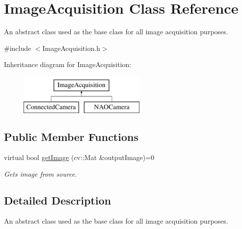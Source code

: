 \hypertarget{classImageAcquisition}{\section{\-Image\-Acquisition \-Class \-Reference}
\label{classImageAcquisition}
}


\-An abstract class used as the base class for all image acquisition purposes.  




{\ttfamily \#include $<$\-Image\-Acquisition.\-h$>$}

\-Inheritance diagram for \-Image\-Acquisition\-:\begin{figure}[H]
\begin{center}
\leavevmode
\includegraphics[height=2.000000cm]{classImageAcquisition}
\end{center}
\end{figure}
\subsection*{\-Public \-Member \-Functions}
\begin{DoxyCompactItemize}
\item 
virtual bool \hyperlink{classImageAcquisition_a737392ecb0e777fd6be9690ecf91d116}{get\-Image} (cv\-::\-Mat \&output\-Image)=0
\begin{DoxyCompactList}\small\item\em \-Gets image from source. \end{DoxyCompactList}\end{DoxyCompactItemize}


\subsection{\-Detailed \-Description}
\-An abstract class used as the base class for all image acquisition purposes. 

